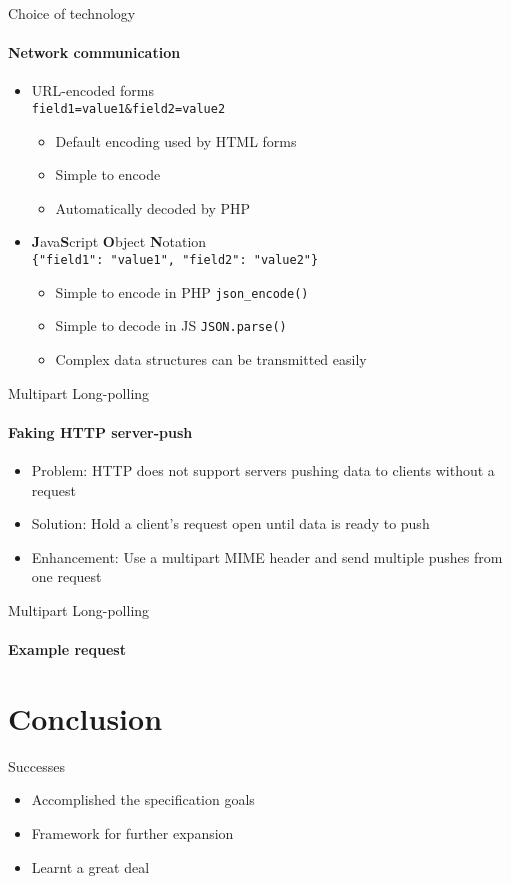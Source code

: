 \begin{frame}[fragile]{Choice of technology}
  \framesubtitle{Network communication}
  \begin{itemize}
    \item URL-encoded forms \\
      \quad \verb|field1=value1&field2=value2|
      \begin{itemize}
        \item Default encoding used by HTML forms
        \item Simple to encode
        \item Automatically decoded by PHP
      \end{itemize}
    \item \textbf{J}ava\textbf{S}cript \textbf{O}bject \textbf{N}otation \\
      \quad \verb|{"field1": "value1", "field2": "value2"}|
      \begin{itemize}
        \item Simple to encode in PHP \verb|json_encode()|
        \item Simple to decode in JS \verb|JSON.parse()|
        \item Complex data structures can be transmitted easily
      \end{itemize}
  \end{itemize}
\end{frame}

\begin{frame}[fragile]{Multipart Long-polling}
  \framesubtitle{Faking HTTP server-push}
  \begin{itemize}
    \item Problem: HTTP does not support servers pushing data to clients without a request

    \item Solution: Hold a client's request open until data is ready to push

    \item Enhancement: Use a multipart MIME header and send multiple pushes from one request
  \end{itemize}
\end{frame}

\begin{frame}[fragile]{Multipart Long-polling}
  \framesubtitle{Example request}
{\tiny
  
}
\end{frame}

\section{Conclusion}
\begin{frame}{Successes}
  \begin{itemize}
    \item Accomplished the specification goals
    \item Framework for further expansion
    \item Learnt a great deal
  \end{itemize}
\end{frame}

